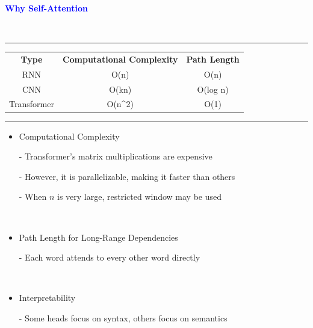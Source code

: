 \documentclass[professionalfont]{beamer}
\begin{document}
\begin{frame}
\begin{center}
    { \textbf{\textcolor{blue}{ {\fontsize{12}{14}\selectfont Why Self-Attention} }} }
\end{center}
\\[0.3cm]

\hrule

\begin{table}[]
\begin{tabular}{ccc}
\textbf{Type} & \textbf{Computational Complexity} & \textbf{Path Length} \\
RNN & O(n) & O(n) \\
CNN & O(kn) & O(log n) \\
Transformer & O(n^2) & O(1)
\end{tabular}
\end{table}

\hrule
\vspace{0.3cm}

{\fontsize{10}{14}\selectfont 
\begin{itemize}
    \item Computational Complexity

    - Transformer's matrix multiplications are expensive

    - However, it is parallelizable, making it faster than others

    - When \( n \) is very large, restricted window may be used

    \\[0.2cm]

    \item Path Length for Long-Range Dependencies

    - Each word attends to every other word directly

    \\[0.2cm]

    \item Interpretability

    - Some heads focus on syntax, others focus on semantics
\end{itemize}
}

\end{frame}
\end{document}
